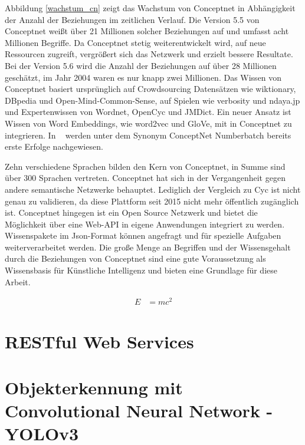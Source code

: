 Abbildung \ref{wachstum_cn} zeigt das Wachstum von Conceptnet in Abhängigkeit der Anzahl der Beziehungen im zeitlichen Verlauf. Die Version 5.5 von Conceptnet weißt über 21 Millionen solcher Beziehungen auf und umfasst acht Millionen Begriffe. Da Conceptnet stetig weiterentwickelt wird, auf neue Ressourcen zugreift, vergrößert sich das Netzwerk und erzielt bessere Resultate. Bei der Version 5.6 wird die Anzahl der Beziehungen auf über 28 Millionen geschätzt, im Jahr 2004 waren es nur knapp zwei Millionen. 
Das Wissen von Conceptnet basiert ursprünglich auf Crowdsourcing Datensätzen wie wiktionary, DBpedia und Open-Mind-Common-Sense, auf Spielen wie verbosity und ndaya.jp und Expertenwissen von Wordnet, OpenCyc und JMDict. Ein neuer Ansatz ist Wissen von Word Embeddings, wie word2vec und GloVe, mit in Conceptnet zu integrieren. In ~\cite{speer2017conceptnet} werden unter dem Synonym ConceptNet Numberbatch bereits erste Erfolge nachgewiesen.

Zehn verschiedene Sprachen bilden den Kern von Conceptnet, in Summe sind über 300 Sprachen vertreten. Conceptnet hat sich in der Vergangenheit gegen andere semantische Netzwerke behauptet. Lediglich der Vergleich zu Cyc ist nicht genau zu validieren, da diese Plattform seit 2015 nicht mehr öffentlich zugänglich ist. Conceptnet hingegen ist ein Open Source Netzwerk und bietet die Möglichkeit über eine Web-API in eigene Anwendungen integriert zu werden. Wissenspakete im Json-Format können angefragt und für spezielle Aufgaben weiterverarbeitet werden. 
Die große Menge an Begriffen und der Wissensgehalt durch die Beziehungen von Conceptnet sind eine gute Voraussetzung als Wissensbasis für Künstliche Intelligenz und bieten eine Grundlage für diese Arbeit. 
\cite{liu2004conceptnet}
\cite{havasi2007conceptnet}
\cite{speer2013conceptnet}
\cite{speer2017conceptnet} 



\begin{align}
E &= mc^2
\end{align}






\section{RESTful Web Services}
\label{sec:cn}



\section{Objekterkennung mit Convolutional Neural Network - YOLOv3}
\label{sec:cn}

